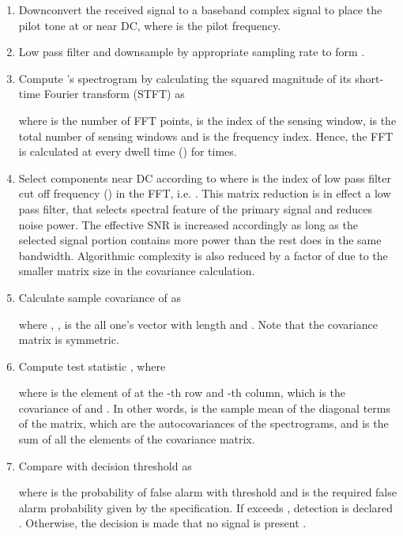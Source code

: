\documentclass[draftclsnofoot,onecolumn,12pt]{IEEEtran}
\begin{document}
    \begin{enumerate}
      \item Downconvert the received signal  to a baseband complex signal 
to place the pilot tone at or near DC, where  is the pilot frequency.
      \item Low pass filter and downsample  by appropriate sampling rate  to form
      . \item Compute 's spectrogram by calculating the squared magnitude of its short-time Fourier transform (STFT) as
      
where  is the number of FFT points,
	  is the index of the sensing window,  is the total number of sensing windows
	 and  is the frequency index.
Hence, the FFT is calculated at every dwell time () for  times. \item Select components near DC according to 
          where  is the index of low pass filter cut off
          frequency () in the FFT, i.e. .
This matrix reduction is in effect a low pass filter, that selects spectral feature of the primary signal and reduces noise power.
	  The effective SNR is increased accordingly as long as the selected signal portion contains more power than the rest does in the same bandwidth.
	  Algorithmic complexity is also reduced by a factor of  due to the smaller matrix size in the covariance calculation.
      \item Calculate sample covariance of  as

        where , ,  is the all one's vector with length  and .
	  Note that the covariance matrix  is symmetric.
      \item Compute test statistic , where
          
          where  is the element of  at the -th row and -th column, which is the covariance of  and . In other words,  is the sample mean of the diagonal terms of the  matrix, which are the autocovariances of the spectrograms, and  is the sum of all the elements of the covariance matrix.
      \item Compare  with decision threshold  as
      
      where  is the probability of false alarm with threshold 
      and  is the required false alarm probability given by the specification. If 
      exceeds , detection is declared . Otherwise, the decision is made that no signal is present .
    \end{enumerate}
\end{document}
